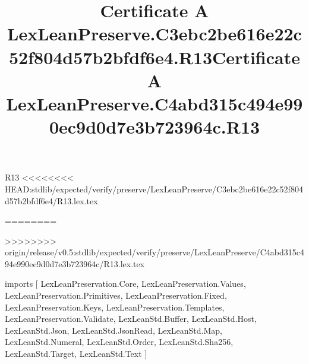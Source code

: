 \begin{lexlean}{R13}
<<<<<<<< HEAD:stdlib/expected/verify/preserve/LexLeanPreserve/C3ebc2be616e22c52f804d57b2bfdf6e4/R13.lex.tex
\title{Certificate A LexLeanPreserve.C3ebc2be616e22c52f804d57b2bfdf6e4.R13}
========
\title{Certificate A LexLeanPreserve.C4abd315c494e990ec9d0d7e3b723964c.R13}
>>>>>>>> origin/release/v0.5:stdlib/expected/verify/preserve/LexLeanPreserve/C4abd315c494e990ec9d0d7e3b723964c/R13.lex.tex
\begin{coremodule}
imports [
  LexLeanPreservation.Core,
  LexLeanPreservation.Values,
  LexLeanPreservation.Primitives,
  LexLeanPreservation.Fixed,
  LexLeanPreservation.Keys,
  LexLeanPreservation.Templates,
  LexLeanPreservation.Validate,
  LexLeanStd.Buffer,
  LexLeanStd.Host,
  LexLeanStd.Json,
  LexLeanStd.JsonRead,
  LexLeanStd.Map,
  LexLeanStd.Numeral,
  LexLeanStd.Order,
  LexLeanStd.Sha256,
  LexLeanStd.Target,
  LexLeanStd.Text
]


\end{coremodule}
\end{lexlean}
